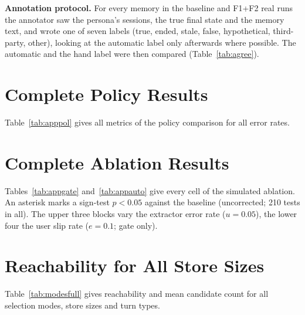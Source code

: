 \IfFileExists{IEEEtran.cls}{\documentclass[journal]{IEEEtran}\def\HAVEIEEE{1}}{\documentclass[10pt,twocolumn]{article}\usepackage[margin=0.7in,columnsep=0.25in]{geometry}}
\begin{document}
\textbf{Annotation protocol.} For every memory in the baseline and F1+F2 real runs the annotator saw the persona's sessions, the true final state and the memory text, and wrote one of seven labels (true, ended, stale, false, hypothetical, third-party, other), looking at the automatic label only afterwards where possible. The automatic and the hand label were then compared (Table~\ref{tab:agree}).

\section{Complete Policy Results}
Table~\ref{tab:apppol} gives all metrics of the policy comparison for all error rates.

\begin{table}[!ht]
\centering\footnotesize
\caption{All policies, all extractor error rates (simulated, $u=0.05$; mean per persona).}
\label{tab:apppol}
\end{table}

\section{Complete Ablation Results}
Tables~\ref{tab:appgate} and~\ref{tab:appauto} give every cell of the simulated ablation. An asterisk marks a sign-test $p<0.05$ against the baseline (uncorrected; 210 tests in all). The upper three blocks vary the extractor error rate ($u=0.05$), the lower four the user slip rate ($e=0.1$; gate only).

\begin{table}[!ht]
\centering\footnotesize
\caption{Ablation, gate policy: all cells (60 paired persona runs each). * : uncorrected $p<0.05$.}
\label{tab:appgate}
\end{table}

\begin{table}[!ht]
\centering\footnotesize
\caption{Ablation, auto-apply policy: error-rate cells (60 paired persona runs each). * : uncorrected $p<0.05$.}
\label{tab:appauto}
\end{table}

\section{Reachability for All Store Sizes}
Table~\ref{tab:modesfull} gives reachability and mean candidate count for all selection modes, store sizes and turn types.
\end{document}
